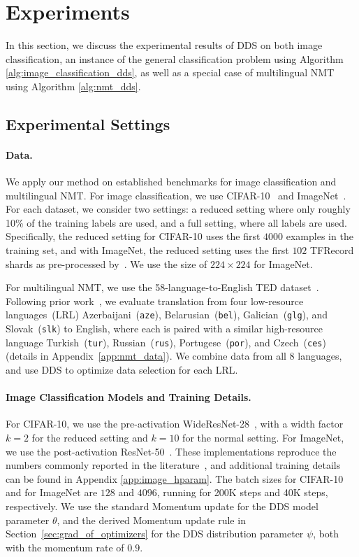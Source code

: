 \section{\label{sec:experiment}Experiments}
In this section, we discuss the experimental results of DDS on both image classification, an instance of the general classification problem using Algorithm \ref{alg:image_classification_dds}, as well as a special case of multilingual NMT using Algorithm \ref{alg:nmt_dds}.

\subsection{\label{exp:settings}Experimental Settings}

\paragraph{Data.} We apply our method on established benchmarks for image classification and multilingual NMT.
For image classification, we use CIFAR-10~\citep{cifar10} and ImageNet~\citep{imagenet}. For each dataset, we consider two settings: a reduced setting where only roughly 10\% of the training labels are used, and a full setting, where all labels are used. Specifically, the reduced setting for CIFAR-10 uses the first $4000$ examples in the training set, and with ImageNet, the reduced setting uses the first $102$ TFRecord shards as pre-processed by~\citet{imagenet_generalize_better}. We use the size of $224 \times 224$ for ImageNet.

For multilingual NMT, we use the 58-language-to-English TED dataset~\citep{ted_pretrain_emb}. 
Following prior work~\citep{ted_pretrain_emb,rapid_adapt_nmt,SDE}, we evaluate translation from four low-resource languages~(LRL) Azerbaijani~(\texttt{aze}), Belarusian~(\texttt{bel}), Galician~(\texttt{glg}), and Slovak~(\texttt{slk}) to English, where each is paired with a similar high-resource language Turkish~(\texttt{tur}), Russian~(\texttt{rus}), Portugese~(\texttt{por}), and Czech~(\texttt{ces}) (details in Appendix~\ref{app:nmt_data}).
We combine data from all 8 languages, and use DDS to optimize data selection for each LRL. 

\paragraph{Image Classification Models and Training Details.}
For CIFAR-10, we use the pre-activation WideResNet-28~\citep{wide_res_net}, with a width factor $k=2$ for the reduced setting and $k=10$ for the normal setting. For ImageNet, we use the post-activation ResNet-50~\citep{res_net}.
These implementations reproduce the numbers commonly reported in the literature~\citep{wide_res_net,res_net,resnext}, and additional training details can be found in Appendix \ref{app:image_hparam}.
The batch sizes for CIFAR-10 and for ImageNet are $128$ and $4096$, running for 200K steps and 40K steps, respectively. We use the standard Momentum update for the DDS model parameter $\theta$, and the derived Momentum update rule in Section~\ref{sec:grad_of_optimizers} for the DDS distribution parameter $\psi$, both with the momentum rate of $0.9$.


